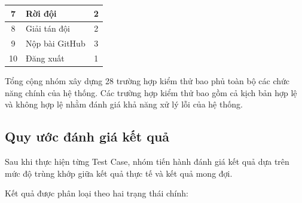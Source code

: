 \begin{table}[H]
\begin{tabular}{|c|p{8cm}|c|}
		\hline
		
		7 &
		Rời đội &
		2
		
		\\
		
		\hline
		
		8 &
		Giải tán đội &
		2
		
		\\
		
		\hline
		
		9 &
		Nộp bài GitHub &
		3
		
		\\
		
		\hline
		
		10 &
		Đăng xuất &
		1
		
		\\
		
		\hline
		
	\end{tabular}
	
\end{table}

Tổng cộng nhóm xây dựng 28 trường hợp kiểm thử bao phủ toàn bộ các chức năng chính của hệ thống. Các trường hợp kiểm thử bao gồm cả kịch bản hợp lệ và không hợp lệ nhằm đánh giá khả năng xử lý lỗi của hệ thống.


\subsection{Quy ước đánh giá kết quả}

Sau khi thực hiện từng Test Case, nhóm tiến hành đánh giá kết quả dựa trên mức độ trùng khớp giữa kết quả thực tế và kết quả mong đợi.

Kết quả được phân loại theo hai trạng thái chính:

